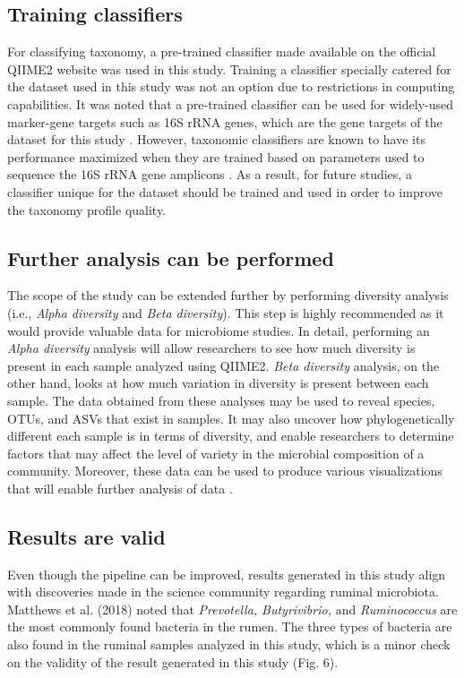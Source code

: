 \documentclass{singlecol-new}
\theoremstyle{TH}{
\newtheorem{lemma}{Lemma}
\newtheorem{theorem}[lemma]{Theorem}
\newtheorem{corrolary}[lemma]{Corrolary}
\newtheorem{conjecture}[lemma]{Conjecture}
\newtheorem{proposition}[lemma]{Proposition}
\newtheorem{claim}[lemma]{Claim}
\newtheorem{stheorem}[lemma]{Wrong Theorem}
\newtheorem{algorithm}{Algorithm}
}
\theoremstyle{THrm}{
\newtheorem{definition}{Definition}[section]
\newtheorem{question}{Question}[section]
\newtheorem{remark}{Remark}
\newtheorem{scheme}{Scheme}
}
\theoremstyle{THhit}{
\newtheorem{case}{Case}[section]
}
\begin{document}
\subsection{Training classifiers}

For classifying taxonomy, a pre-trained classifier made available on the official QIIME2 website was used in this study. Training a classifier specially catered for the dataset used in this study was not an option due to restrictions in computing capabilities. It was noted that a pre-trained classifier can be used for widely-used marker-gene targets such as 16S rRNA genes, which are the gene targets of the dataset for this study \citep{Q2}. However, taxonomic classifiers are known to have its performance maximized when they are trained based on parameters used to sequence the 16S rRNA gene amplicons \citep{dataresources19}. As a result, for future studies, a classifier unique for the dataset should be trained and used in order to improve the taxonomy profile quality.

\subsection{Further analysis can be performed}
The scope of the study can be extended further by performing diversity analysis (i.e., \textit{Alpha diversity} and \textit{Beta diversity}). This step is highly recommended as it would provide valuable data for microbiome studies. In detail, performing an \textit{Alpha diversity} analysis will allow researchers to 
see how much diversity is present in each sample analyzed using QIIME2. \textit{Beta diversity} analysis, on the other hand, looks at how much variation in diversity is present between each sample. The data obtained from these analyses may be used to reveal species, OTUs, and ASVs that exist in samples. It may also uncover how phylogenetically different each sample is in terms of diversity, and enable researchers to determine factors that may affect the level of variety in the microbial composition of a community. Moreover, these data can be used to produce various visualizations that will enable further analysis of data \citep{overview19.1}. 

\subsection{Results are valid}
Even though the pipeline can be improved, results generated in this study align with discoveries made in the science community regarding ruminal microbiota. Matthews et al. (2018) noted that \textit{Prevotella, Butyrivibrio,} and \textit{Ruminococcus} are the most commonly found bacteria in the rumen. The three types of bacteria are also found in the ruminal samples analyzed in this study, which is a minor check on the validity of the result generated in this study (Fig. 6).
\end{document}
